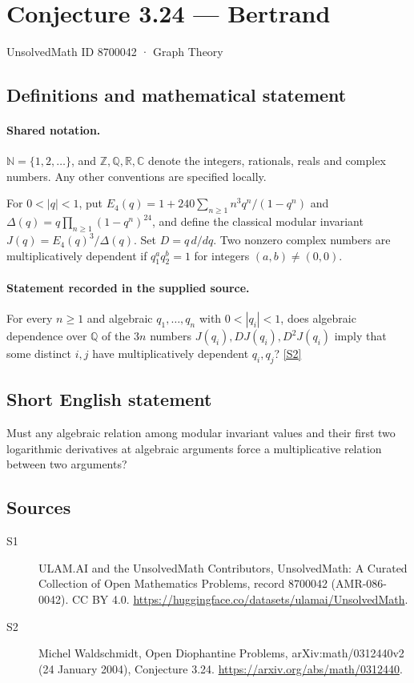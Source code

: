\documentclass[11pt]{article}
\newcommand{\sref}[2]{\hyperlink{source:#1:#2}{[S#2]}}
\begin{document}
\setcounter{section}{8700041}
\section{Conjecture 3.24 — Bertrand}\label{8700042}
{\small\sffamily UnsolvedMath ID 8700042 · Graph Theory}
\subsection{Definitions and mathematical statement}

\paragraph{Shared notation.}$\mathbb N=\{1,2,\ldots\}$, and $\mathbb Z,\mathbb Q,\mathbb R,\mathbb C$ denote the integers, rationals, reals and complex numbers. Any other conventions are specified locally.


For $0<|q|<1$, put $E_4(q)=1+240\sum_{n\ge1}n^3q^n/(1-q^n)$ and $\Delta(q)=q\prod_{n\ge1}(1-q^n)^{24}$, and define the classical modular invariant $J(q)=E_4(q)^3/\Delta(q)$. Set $D=q\,d/dq$. Two nonzero complex numbers are multiplicatively dependent if $q_1^a q_2^b=1$ for integers $(a,b)\ne(0,0)$.
\paragraph{Statement recorded in the supplied source.}
For every $n\ge1$ and algebraic $q_1,\ldots,q_n$ with $0<|q_i|<1$, does algebraic dependence over $\mathbb Q$ of the $3n$ numbers $J(q_i),DJ(q_i),D^2J(q_i)$ imply that some distinct $i,j$ have multiplicatively dependent $q_i,q_j$? \sref{8700042}{2}
\subsection{Short English statement}
Must any algebraic relation among modular invariant values and their first two logarithmic derivatives at algebraic arguments force a multiplicative relation between two arguments?
\subsection{Sources}
\begin{description}
\item[\hypertarget{source:8700042:1}{S1}] ULAM.AI and the UnsolvedMath Contributors, UnsolvedMath: A Curated Collection of Open Mathematics Problems, record 8700042 (AMR-086-0042). CC BY 4.0. \url{https://huggingface.co/datasets/ulamai/UnsolvedMath}.
\item[\hypertarget{source:8700042:2}{S2}] Michel Waldschmidt, Open Diophantine Problems, arXiv:math/0312440v2 (24 January 2004), Conjecture 3.24. \url{https://arxiv.org/abs/math/0312440}.
\end{description}
\label{end:8700042}
\end{document}
